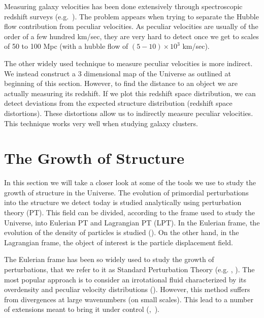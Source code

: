 Measuring galaxy velocities has been done extensively through spectroscopic redshift surveys (e.g.~\cite{2013AJ....145...10D}). The problem appears when trying to separate the Hubble flow contribution from peculiar velocities. As peculiar velocities are usually of the order of a few hundred km/sec, they are very hard to detect once we get to scales of 50 to 100 Mpc (with a hubble flow of $(5-10) \times 10^3$ km/sec). 

The other widely used technique to measure peculiar velocities is more indirect. We instead construct a 3 dimensional map of the Universe as outlined at beginning of this section. However, to find the distance to an object we are actually measuring its redshift. If we plot this redshift space distribution, we can detect deviations from the expected structure distribution (redshift space distortions). These distortions allow us to indirectly measure peculiar velocities. This technique works very well when studying galaxy clusters.

    
    

\section{The Growth of Structure}

In this section we will take a closer look at some of the tools we use to study the growth of structure in the Universe. The evolution of primordial perturbations into the structure we detect today is studied analytically using perturbation theory (PT). This field can be divided, according to the frame used to study the Universe, into Eulerian PT and Lagrangian PT (LPT). In the Eulerian frame, the evolution of the density of particles is studied (\cite{Bernardeau_PT}). On the other hand, in the Lagrangian frame, the object of interest is the particle displacement field.

The Eulerian frame has been so widely used to study the growth of perturbations, that we refer to it as Standard Perturbation Theory (e.g. \cite{1983MNRAS.203..345V}, \cite{peebles1980large}). The most popular approach is to consider an irrotational fluid characterized by its overdensity and peculiar velocity distributions (\cite{Carlson_perturbation_theory}). However, this method suffers from divergences at large wavenumbers (on small scales). This lead to a number of extensions meant to bring it under control (\cite{2006PhRvD..73f3519C},~\cite{2008PhRvD..77b3533C}). 


